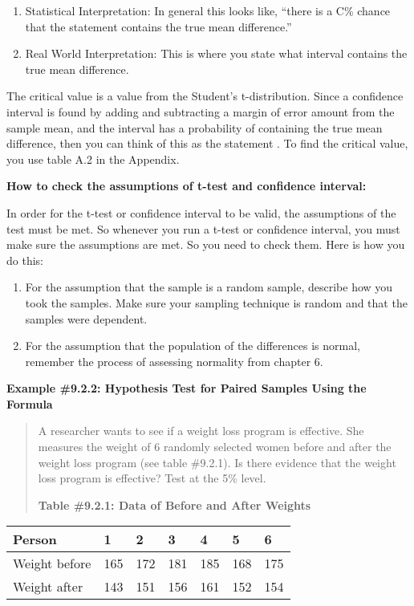 \documentclass[]{book}
\begin{document}
\begin{enumerate}
\def\labelenumi{\arabic{enumi}.}
\setcounter{enumi}{1}
\item
  Statistical Interpretation: In general this looks like, ``there is a C\% chance that the statement contains the true mean difference.''
\item
  Real World Interpretation: This is where you state what interval contains the true mean difference.
\end{enumerate}

The critical value is a value from the Student's t-distribution. Since a confidence interval is found by adding and subtracting a margin of error amount from the sample mean, and the interval has a probability of containing the true mean difference, then you can think of this as the statement . To find the critical value, you use table A.2 in the Appendix.

\textbf{How to check the assumptions of t-test and confidence interval:}

In order for the t-test or confidence interval to be valid, the assumptions of the test must be met. So whenever you run a t-test or confidence interval, you must make sure the assumptions are met. So you need to check them. Here is how you do this:

\begin{enumerate}
\def\labelenumi{\arabic{enumi}.}
\item
  For the assumption that the sample is a random sample, describe how you took the samples. Make sure your sampling technique is random and that the samples were dependent.
\item
  For the assumption that the population of the differences is normal, remember the process of assessing normality from chapter 6.
\end{enumerate}

\textbf{Example \#9.2.2: Hypothesis Test for Paired Samples Using the Formula}

\begin{quote}
A researcher wants to see if a weight loss program is effective. She measures the weight of 6 randomly selected women before and after the weight loss program (see table \#9.2.1). Is there evidence that the weight loss program is effective? Test at the 5\% level.

\textbf{Table \#9.2.1: Data of Before and After Weights}
\end{quote}

\begin{longtable}[]{@{}lllllll@{}}
\toprule
Person & 1 & 2 & 3 & 4 & 5 & 6\tabularnewline
\midrule
\endhead
Weight before & 165 & 172 & 181 & 185 & 168 & 175\tabularnewline
Weight after & 143 & 151 & 156 & 161 & 152 & 154\tabularnewline
\bottomrule
\end{longtable}
\end{document}
